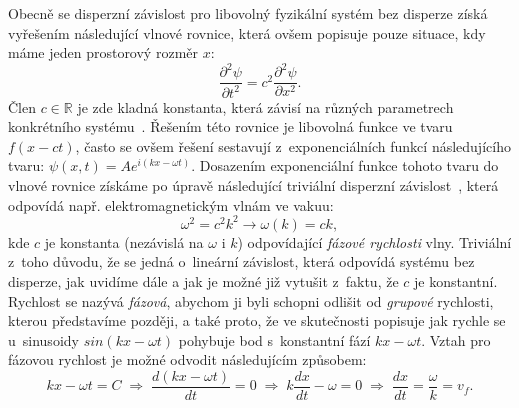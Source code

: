 Obecně se disperzní závislost pro libovolný
fyzikální systém bez disperze získá vyřešením
následující vlnové rovnice, která ovšem popisuje
pouze situace, kdy máme jeden prostorový 
rozměr $x$:
$$
\frac{\partial^2 \psi}{\partial t^2}
   = c^2 \frac{\partial^2 \psi}{\partial x^2}.
$$
Člen $c \in \mathbb{R}$ je zde kladná konstanta,
která závisí na různých parametrech konkrétního
systému~\cite{wiki_wave_eq}. Řešením této rovnice
je libovolná funkce ve tvaru $f(x - ct)$, často
se ovšem řešení sestavují z~exponenciálních funkcí
následujícího tvaru:
$\psi(x,t) = Ae^{i(kx - \omega t)}$. Dosazením
exponenciální funkce tohoto tvaru do vlnové
rovnice získáme po úpravě následující triviální
disperzní závislost~\cite{harvard_disp}, která
odpovídá např. elektromagnetickým vlnám ve vakuu:
$$
\omega^2 = c^2k^2 \longrightarrow
\omega(k) = ck,
$$
kde $c$ je konstanta (nezávislá na $\omega$
i $k$) odpovídající
\textit{fázové rychlosti} vlny.
Triviální z~toho důvodu, že se jedná o~lineární
závislost, která odpovídá systému bez disperze,
jak uvidíme dále a jak je možné již vytušit
z~faktu, že $c$ je konstantní. Rychlost se nazývá
\textit{fázová}, abychom ji byli schopni odlišit
od \textit{grupové} rychlosti, kterou představíme
později, a také proto, že ve skutečnosti popisuje
jak rychle se u~sinusoidy $sin(kx - \omega t)$
pohybuje bod s~konstantní fází $kx - \omega t$.
Vztah pro fázovou rychlost je možné odvodit
následujícím způsobem:
$$
kx - \omega t = C \;\Longrightarrow\;
\frac{d(kx - \omega t)}{dt} = 0 \;\Longrightarrow\;
k\frac{dx}{dt} - \omega = 0 \;\Longrightarrow\;
\frac{dx}{dt} = \frac{\omega}{k} = v_f.
$$

